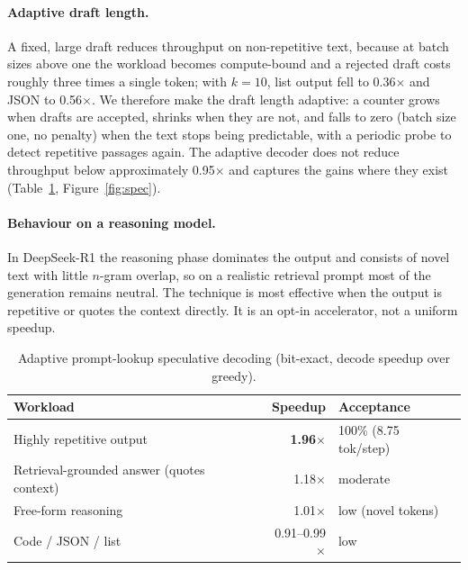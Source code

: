 \documentclass[10pt,a4paper]{article}
\begin{document}
\paragraph{Adaptive draft length.} A fixed, large draft reduces throughput on non-repetitive text, because at batch sizes above one the workload becomes compute-bound and a rejected draft costs roughly three times a single token; with $k{=}10$, list output fell to 0.36$\times$ and JSON to 0.56$\times$. We therefore make the draft length adaptive: a counter grows when drafts are accepted, shrinks when they are not, and falls to zero (batch size one, no penalty) when the text stops being predictable, with a periodic probe to detect repetitive passages again. The adaptive decoder does not reduce throughput below approximately 0.95$\times$ and captures the gains where they exist (Table~\ref{tab:spec}, Figure~\ref{fig:spec}).

\paragraph{Behaviour on a reasoning model.} In DeepSeek-R1 the reasoning phase dominates the output and consists of novel text with little $n$-gram overlap, so on a realistic retrieval prompt most of the generation remains neutral. The technique is most effective when the output is repetitive or quotes the context directly. It is an opt-in accelerator, not a uniform speedup.

\begin{table}[H]
\centering\small
\caption{Adaptive prompt-lookup speculative decoding (bit-exact, decode speedup over greedy).}
\label{tab:spec}
\begin{tabularx}{\textwidth}{Xrl}
\toprule
\textbf{Workload} & \textbf{Speedup} & \textbf{Acceptance} \\
\midrule
Highly repetitive output & \textbf{1.96$\times$} & 100\% (8.75 tok/step) \\
Retrieval-grounded answer (quotes context) & 1.18$\times$ & moderate \\
Free-form reasoning & 1.01$\times$ & low (novel tokens) \\
Code / JSON / list & 0.91--0.99$\times$ & low \\
\bottomrule
\end{tabularx}
\end{table}
\end{document}
